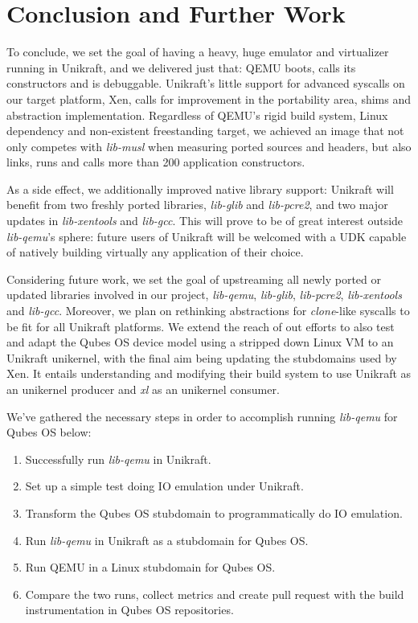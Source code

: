 \chapter{Conclusion and Further Work}
\label{chapter:conclusion-further-work}

To conclude, we set the goal of having a heavy, huge emulator and virtualizer running in Unikraft, and we delivered just that: QEMU boots, calls its constructors and is debuggable.
Unikraft's little support for advanced syscalls on our target platform, Xen, calls for improvement in the portability area, shims and abstraction implementation.
Regardless of QEMU's rigid build system, Linux dependency and non-existent freestanding target, we achieved an image that not only competes with \textit{lib-musl} when measuring ported sources and headers, but also links, runs and calls more than 200 application constructors.

As a side effect, we additionally improved native library support: Unikraft will benefit from two freshly ported libraries, \textit{lib-glib} and \textit{lib-pcre2}, and two major updates in \textit{lib-xentools} and \textit{lib-gcc}.
This will prove to be of great interest outside \textit{lib-qemu}'s sphere: future users of Unikraft will be welcomed with a UDK capable of natively building virtually any application of their choice.

Considering future work, we set the goal of upstreaming all newly ported or updated libraries involved in our project, \textit{lib-qemu}, \textit{lib-glib}, \textit{lib-pcre2}, \textit{lib-xentools} and \textit{lib-gcc}.
Moreover, we plan on rethinking abstractions for \textit{clone}-like syscalls to be fit for all Unikraft platforms.
We extend the reach of out efforts to also test and adapt the Qubes OS device model using a stripped down Linux VM to an Unikraft unikernel, with the final aim being updating the stubdomains used by Xen.
It entails understanding and modifying their build system to use Unikraft as an unikernel producer and \textit{xl} as an unikernel consumer.

We've gathered the necessary steps in order to accomplish running \textit{lib-qemu} for Qubes OS below:

\begin{enumerate}
    \item Successfully run \textit{lib-qemu} in Unikraft.
    \item Set up a simple test doing IO emulation under Unikraft.
    \item Transform the Qubes OS stubdomain to programmatically do IO emulation.
    \item Run \textit{lib-qemu} in Unikraft as a stubdomain for Qubes OS.
    \item Run QEMU in a Linux stubdomain for Qubes OS.
    \item Compare the two runs, collect metrics and create pull request with the build instrumentation in Qubes OS repositories.
\end{enumerate}

